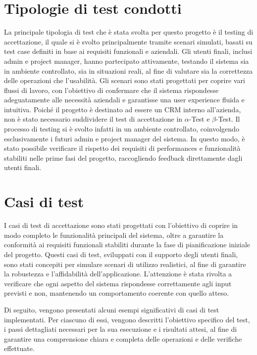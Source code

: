 \documentclass[target=bach,aauheader=,style=]{thud}
\begin{document}
\section{Tipologie di test condotti}
La principale tipologia di test che è stata svolta per questo progetto è il testing di accettazione, il quale si è svolto principalmente tramite scenari simulati, basati su test case definiti in base ai requisiti funzionali e aziendali. Gli utenti finali, inclusi admin e project manager, hanno partecipato attivamente, testando il sistema sia in ambiente controllato, sia in situazioni reali, al fine di valutare sia la correttezza delle operazioni che l'usabilità. Gli scenari sono stati progettati per coprire vari flussi di lavoro, con l'obiettivo di confermare che il sistema rispondesse adeguatamente alle necessità aziendali e garantisse una user experience fluida e intuitiva. Poiché il progetto è destinato ad essere un CRM interno all'azienda, non è stato necessario suddividere il test di accettazione in \(\alpha\)-Test e \(\beta\)-Test. Il processo di testing si è svolto infatti in un ambiente controllato, coinvolgendo esclusivamente i futuri admin e project manager del sistema. In questo modo, è stato possibile verificare il rispetto dei requisiti di performances e funzionalità stabiliti nelle prime fasi del progetto, raccogliendo feedback direttamente dagli utenti finali.

\section{Casi di test}\label{test_cases}
I casi di test di accettazione sono stati progettati con l'obiettivo di coprire in modo completo le funzionalità principali del sistema, oltre a garantire la conformità ai requisiti funzionali stabiliti durante la fase di pianificazione iniziale del progetto. Questi casi di test, sviluppati con il supporto degli utenti finali, sono stati concepiti per simulare scenari di utilizzo realistici, al fine di garantire la robustezza e l'affidabilità dell'applicazione. L'attenzione è stata rivolta a verificare che ogni aspetto del sistema rispondesse correttamente agli input previsti e non, mantenendo un comportamento coerente con quello atteso. 

\noindent Di seguito, vengono presentati alcuni esempi significativi di casi di test implementati. Per ciascuno di essi, vengono descritti l'obiettivo specifico del test, i passi dettagliati necessari per la sua esecuzione e i risultati attesi, al fine di garantire una comprensione chiara e completa delle operazioni e delle verifiche effettuate.
\end{document}
